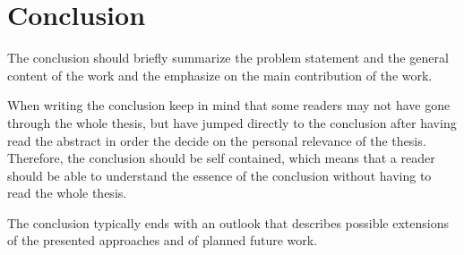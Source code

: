 \chapter{Conclusion}
\label{conclusion}

The conclusion should briefly summarize the problem statement and the general content of the work and the emphasize on the main contribution of the work.

When writing the conclusion keep in mind that some readers may not have gone through the whole thesis, but have jumped directly to the conclusion after having read the abstract in order the decide on the personal relevance of the thesis. Therefore, the conclusion should be self contained, which means that a reader should be able to understand the essence of the conclusion without having to read the whole thesis.

The conclusion typically ends with an outlook that describes possible extensions of the presented approaches and of planned future work.
